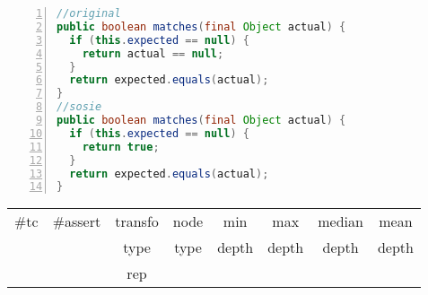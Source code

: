 \begin{minipage}{\columnwidth}
\begin{lstlisting}[caption={Two variants of \texttt{matches} in EasyMock},language=java,numbers=left]
//original
public boolean matches(final Object actual) {
  if (this.expected == null) {
    return actual == null;
  }
  return expected.equals(actual);
}
//sosie
public boolean matches(final Object actual) {
  if (this.expected == null) {
    return true;
  }
  return expected.equals(actual);
}
\end{lstlisting}
\tabcolsep=0.11cm
\begin{tabular}{>{\small}c>{\small}c>{\small}c>{\small}c>{\small}c>{\small}c>{\small}c>{\small}c}
\hline
\rowcolor{lightgray} \#tc & \#assert & transfo & node & min & max & median & mean   \\
\rowcolor{lightgray}  & & type & type & depth  & depth & depth & depth  \\ 
\hline
&  & rep &  &  &  &  & \\
\hline
\end{tabular}
\end{minipage}